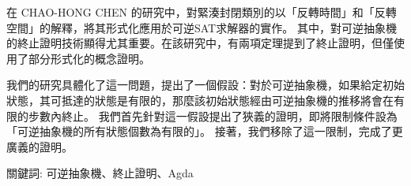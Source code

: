 \begin{abstractzh}
    在 CHAO-HONG CHEN 的研究中，對緊湊封閉類別的以「反轉時間」和「反轉空間」的解釋，將其形式化應用於可逆SAT求解器的實作。
    其中，對可逆抽象機的終止證明技術顯得尤其重要。在該研究中，有兩項定理提到了終止證明，但僅使用了部分形式化的概念證明。

    我們的研究具體化了這一問題，提出了一個假設：對於可逆抽象機，如果給定初始狀態，其可抵達的狀態是有限的，那麼該初始狀態經由可逆抽象機的推移將會在有限的步數內終止。
    我們首先針對這一假設提出了狹義的證明，即將限制條件設為「可逆抽象機的所有狀態個數為有限的」。
    接著，我們移除了這一限制，完成了更廣義的證明。

\vspace{17cm}

關鍵詞: 可逆抽象機、終止證明、Agda

\end{abstractzh}